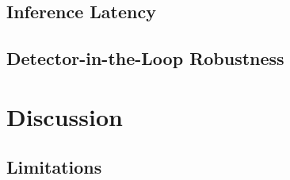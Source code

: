 \subsection{Inference Latency}

\subsection{Detector-in-the-Loop Robustness}

\section{Discussion}
\subsection{Limitations}

